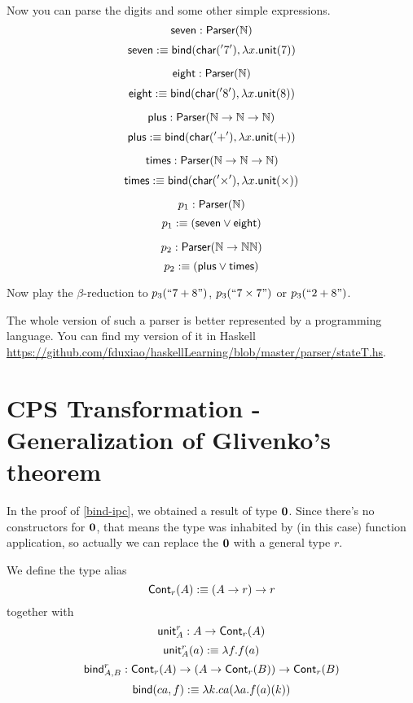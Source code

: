 Now you can parse the digits and some other simple expressions.
$$
\text{\sf seven}: \text{\sf Parser}(\mathbb{N})
$$
$$
\text{\sf seven} :\equiv \text{\sf bind}(\text{\sf char}('7'),\lambda x.\text{\sf unit}(7))
$$

$$
\text{\sf eight}: \text{\sf Parser}(\mathbb{N})
$$
$$
\text{\sf eight} :\equiv \text{\sf bind}(\text{\sf char}('8'),\lambda x.\text{\sf unit}(8))
$$

$$
\text{\sf plus}: \text{\sf Parser}(\mathbb{N}\to\mathbb{N}\to\mathbb{N})
$$
$$
\text{\sf plus} :\equiv \text{\sf bind}(\text{\sf char}('+'),\lambda x.\text{\sf unit}(+))
$$

$$
\text{\sf times}: \text{\sf Parser}(\mathbb{N}\to\mathbb{N}\to\mathbb{N})
$$
$$
\text{\sf times} :\equiv \text{\sf bind}(\text{\sf char}('\times'),\lambda x.\text{\sf unit}(\times))
$$

$$
p_1: \text{\sf Parser}(\mathbb{N})
$$
$$
p_1 :\equiv (\text{\sf seven}\vee\text{\sf eight})
$$

$$
p_2: \text{\sf Parser}(\mathbb{N}\to\mathbb{N}\mathbb{N})
$$
$$
p_2 :\equiv (\text{\sf plus}\vee\text{\sf times})
$$


Now play the $\beta$-reduction to $p_3(``7+8")$,
$p_3(``7\times7")$ or $p_3(``2+8")$.

The whole version of such a parser is better represented by a
programming language. You can find my version of it in Haskell
\url{https://github.com/fduxiao/haskellLearning/blob/master/parser/stateT.hs}.

\section{CPS Transformation - Generalization of Glivenko's theorem}
In the proof of \cref{bind-ipc}, we obtained a result of
type $\mathbf{0}$. Since there's no constructors for $\mathbf{0}$, that means
the type was inhabited by (in this case) function application, so
actually we can replace the $\mathbf{0}$ with a general type $r$.

\newcommand{\Cont}{\name{Cont}}

\begin{definition}
    We define the type alias
    $$
        \Cont_r(A)\defn(A\to r)\to r
    $$
    together with
    $$
        \unit^r_A: A\to\Cont_r(A)
    $$
    $$
        \text{\sf unit}^r_A(a):\equiv\lambda f. f(a)
    $$
    $$
    \bind^r_{A,B}: \Cont_r(A)\to(A\to\Cont_r(B))\to\Cont_r(B)
    $$
    $$
    \text{\sf bind}(ca, f) :\equiv \lambda k.
        ca(\lambda a.f(a)(k))
    $$
\end{definition}

